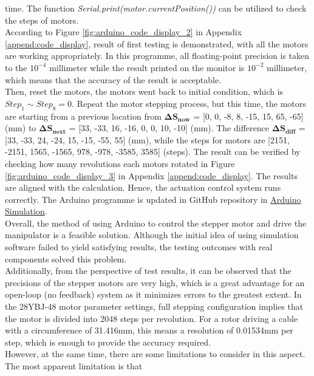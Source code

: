 time. The function \emph{Serial.print(motor.currentPosition())} can be utilized to check the steps of motors.\\
According to Figure \ref{fig:arduino_code_display_2} in Appendix \ref{append:code_display}, result of first testing 
is demonstrated, with all the motors are working appropriately. In this programme, all floating-point precision 
is taken to the $10^{-4}$ millimeter while the result printed on the monitor is $10^{-2}$ millimeter, 
which means that the accuracy of the result is acceptable.\\
Then, reset the motors, the motors went back to initial condition, which is $Step_1 \sim Step_8=0$. Repeat the 
motor stepping process, but this time, the motors are starting from a previous location from
$\boldsymbol{\Delta S_{now}}$ = [0, 0, -8, 8, -15, 15, 65, -65] (mm) to $\boldsymbol{\Delta S_{next}}$ = 
[33, -33, 16, -16, 0, 0, 10, -10] (mm). The difference $\boldsymbol{\Delta S_{diff}}$ = 
[33, -33, 24, -24, 15, -15, -55, 55] (mm), while the steps for motors are 
[2151, -2151, 1565, -1565, 978, -978, -3585, 3585] (steps). The result can be verified by checking how many 
revolutions each motors rotated in Figure \ref{fig:arduino_code_display_3} in Appendix \ref{append:code_display}.
The results are aligned with the calculation. Hence, the actuation control system runs correctly.
The Arduino programme is updated in GitHub repository in 
\href{https://github.com/yezehao/Compact-Continuum-Manipulator-Platform/tree/main/Arduino-Simulation}
{Arduino Simulation}. \\
Overall, the method of using Arduino to control the stepper motor and drive the manipulator is a feasible solution. 
Although the initial idea of using simulation software failed to yield satisfying results, the testing outcomes with 
real components solved this problem.\\
Additionally, from the perspective of test results, it can be observed that the precisions of the stepper motors are 
very high, which is a great advantage for an open-loop (no feedback) system as it minimizes errors to the greatest 
extent. In the 28YBJ-48 motor parameter settings, full stepping configuration implies that the motor is divided into 
2048 steps per revolution. For a rotor driving a cable with a circumference of 31.416mm, this means a resolution of 
0.01534mm per step, which is enough to provide the accuracy required.\\
However, at the same time, there are some limitations to consider in this aspect. The most apparent limitation is that 
